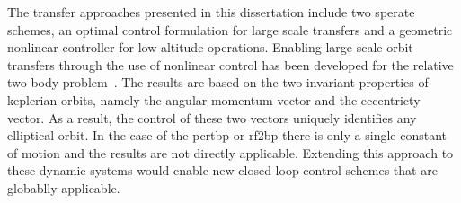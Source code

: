 The transfer approaches presented in this dissertation include two sperate schemes, an optimal control formulation for large scale transfers and a geometric nonlinear controller for low altitude operations.
Enabling large scale orbit transfers through the use of nonlinear control has been developed for the relative two body problem~\cite{chang2002}.
The results are based on the two invariant properties of keplerian orbits, namely the angular momentum vector and the eccentricty vector.
As a result, the control of these two vectors uniquely identifies any elliptical orbit.
In the case of the \gls{pcrtbp} or \gls{rf2bp} there is only a single constant of motion and the results are not directly applicable.
Extending this approach to these dynamic systems would enable new closed loop control schemes that are globablly applicable.



